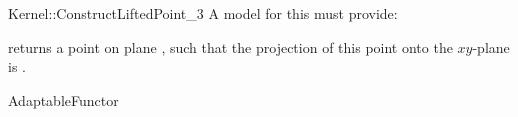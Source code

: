 \begin{ccRefFunctionObjectConcept}{Kernel::ConstructLiftedPoint_3}
A model for this must provide:


       {returns a point  on plane , such that the projection of
        this point onto the $xy$-plane is .}

\ccRefines
AdaptableFunctor

\ccSeeAlso
{} \\

\end{ccRefFunctionObjectConcept}
